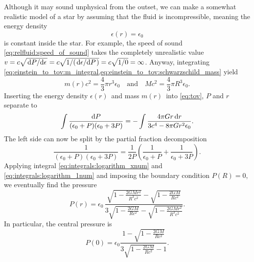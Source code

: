 Although it may sound unphysical from the outset, we can make a somewhat realistic model of a star by assuming that the fluid is incompressible, meaning the energy density
\begin{equation}
	\epsilon(r) = \epsilon_0
\end{equation}
is constant inside the star.
For example, the speed of sound \eqref{eq:relfluid:speed_of_sound} takes the completely unrealistic value $v = c \sqrt{\odv{P}/{\epsilon}} = c \sqrt{1/(\odv{\epsilon}/{P})} = c \sqrt{1/0} = \infty$.
Anyway, integrating \cref{eq:einstein_to_tov:m_integral,eq:einstein_to_tov:schwarzschild_mass} yield
\begin{equation}
	m(r) c^2 = \frac{4}{3} \pi r^3 \epsilon_0 
	\quad \text{and} \quad
	M c^2 = \frac{4}{3} \pi R^3 \epsilon_0 
	.
\end{equation}
Inserting the energy density $\epsilon(r)$ and mass $m(r)$ into \cref{eq:tov}, $P$ and $r$ separate to
\begin{equation*}
	\int \frac{\mathop{}\!\mathrm{d} P}{(\epsilon_0+P)(\epsilon_0+3P)} = - \int \frac{4 \pi G r \mathop{}\!\mathrm{d} r}{3 c^4 - 8\pi G r^2 \epsilon_0} .
\end{equation*}
The left side can now be split by the partial fraction decomposition
\begin{equation*}
	\frac{1}{(\epsilon_0+P)(\epsilon_0+3P)} = \frac{1}{2P} \left( \frac{1}{\epsilon_0+P} + \frac{1}{\epsilon_0+3P} \right) .
\end{equation*}
Applying integral \eqref{eq:integrals:logarithm_xnum} and \eqref{eq:integrals:logarithm_1num} and imposing the boundary condition $P(R) = 0$, we eventually find the pressure
\begin{equation}
	P(r) = \epsilon_0 \, \frac{\sqrt{1-\frac{2GMr^2}{R^3c^2}} - \sqrt{1-\frac{2GM}{Rc^2}}}{3 \sqrt{1-\frac{2GM}{Rc^2}} - \sqrt{1-\frac{2GMr^2}{R^3c^2}}} .
	\label{eq:incompressible_star:pressure}
\end{equation}
In particular, the central pressure is
\begin{equation}
	P(0) = \epsilon_0 \frac{1 - \sqrt{1 - \frac{2GM}{Rc^2}}}{3 \sqrt{1-\frac{2GM}{Rc^2}} - 1} .
	\label{eq:incompressible_star:central_pressure}
\end{equation}
